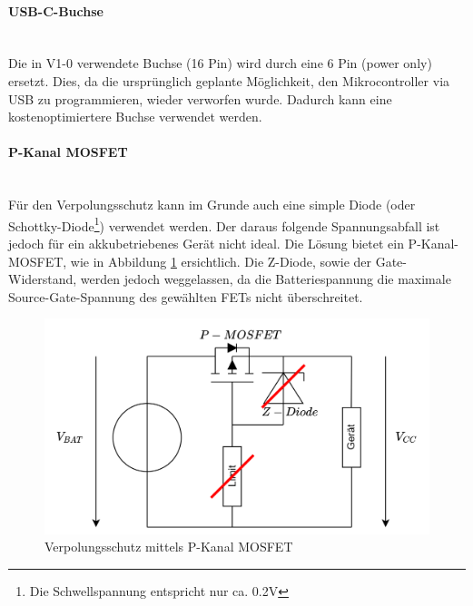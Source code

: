 \documentclass[12pt]{article}
\begin{document}
	\paragraph{USB-C-Buchse}\mbox{}\\
	Die in V1-0 verwendete Buchse (16 Pin) wird durch eine 6 Pin (power only) ersetzt. Dies, da die ursprünglich geplante Möglichkeit, den Mikrocontroller via USB zu programmieren, wieder verworfen wurde. Dadurch kann eine kostenoptimiertere Buchse verwendet werden.
	\paragraph{P-Kanal MOSFET} \label{P-Kanal MOSFET} \mbox{}\\
	Für den Verpolungsschutz kann im Grunde auch eine simple Diode (oder Schottky-Diode\footnote{Die Schwellspannung entspricht nur ca. 0.2V}) verwendet werden. Der daraus folgende Spannungsabfall ist jedoch für ein akkubetriebenes Gerät nicht ideal. Die Lösung bietet ein P-Kanal-MOSFET, wie in Abbildung \ref{fig:batverpolungsschutz} ersichtlich. Die Z-Diode, sowie der Gate-Widerstand, werden jedoch weggelassen, da die Batteriespannung die maximale Source-Gate-Spannung des gewählten FETs nicht überschreitet.
	\begin{figure}[H]
		\centering
		\includegraphics[width=0.7\linewidth]{images/BAT_Verpolungsschutz}
		\caption{Verpolungsschutz mittels P-Kanal MOSFET}
		\label{fig:batverpolungsschutz}
	\end{figure}
	
\end{document}
